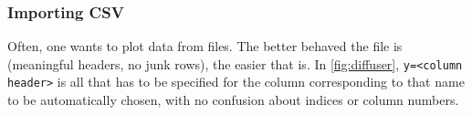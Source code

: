 \subsubsection{Importing CSV}

Often, one wants to plot data from files.
The better behaved the file is (meaningful headers, no junk rows), the easier that is.
In \cref{fig:diffuser}, \verb|y=<column header>| is all that has to be specified for the
column corresponding to that name to be automatically chosen, with no confusion
about indices or column numbers.
%

